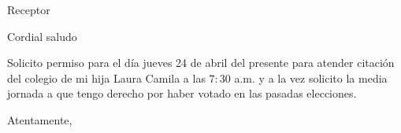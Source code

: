 \documentclass[letterpaper,spanish,11pt]{letter}
\begin{document}
\begin{letter}{Receptor}
	
\opening{Cordial saludo}

Solicito permiso para el día jueves 24 de abril del presente para atender citación del colegio de mi hija Laura Camila a las $7:30$ a.m. y a la vez solicito la media jornada a que tengo derecho por haber votado en las pasadas elecciones.

\closing{Atentamente,}


\end{letter}
\end{document}
